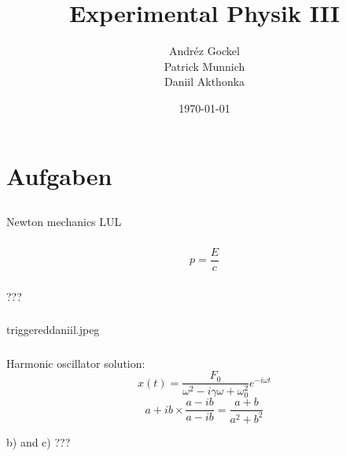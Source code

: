 \documentclass[12pt]{report}
\begin{document}
 
\title{Experimental Physik III}
\author{Andréz Gockel\\Patrick Munnich\\Daniil Akthonka}
 
\date{\today}
\maketitle

\chapter{Aufgaben}

\section{}

\section{}

\section{}

\subsection{}
Newton mechanics LUL

\subsection{}
\[p=\frac{E}{c}\]

\subsection{}
???

\subsection{}
triggereddaniil.jpeg

\subsection{}
Harmonic oscillator solution:
\[x(t)=\frac{F_0}{\omega^2-i\gamma\omega+\omega_0^2}e^{-i\omega t}\]
\[a+ib\times\frac{a-ib}{a-ib}=\frac{a+b}{a^2+b^2}\]

b) and c) ???
\end{document}
